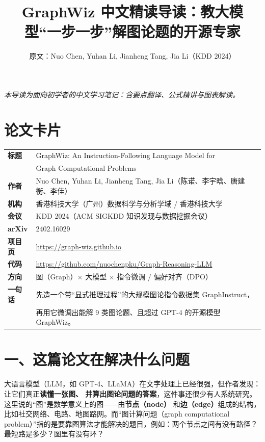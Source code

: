 \documentclass[11pt,UTF8,fontset=fandol]{ctexart}
\title{GraphWiz 中文精读导读：教大模型“一步一步”解图论题的开源专家}
\author{原文：Nuo Chen, Yuhan Li, Jianheng Tang, Jia Li（KDD 2024）}
\date{}
\begin{document}
\maketitle
\begin{center}\small\textit{本导读为面向初学者的中文学习笔记：含要点翻译、公式精讲与图表解读。}\end{center}

\section*{论文卡片}
\begin{center}
\begin{tabular}{@{}ll@{}}
\toprule
\textbf{标题} & GraphWiz: An Instruction-Following Language Model for \\
            & Graph Computational Problems \\
\textbf{作者} & Nuo Chen, Yuhan Li, Jianheng Tang, Jia Li（陈诺、李宇晗、唐建衡、李佳） \\
\textbf{机构} & 香港科技大学（广州）数据科学与分析学域 / 香港科技大学 \\
\textbf{会议} & KDD 2024（ACM SIGKDD 知识发现与数据挖掘会议） \\
\textbf{arXiv} & 2402.16029 \\
\textbf{项目页} & \url{https://graph-wiz.github.io} \\
\textbf{代码} & \url{https://github.com/nuochenpku/Graph-Reasoning-LLM} \\
\textbf{方向} & 图（Graph）$\times$ 大模型 $\times$ 指令微调 / 偏好对齐（DPO） \\
\textbf{一句话} & 先造一个带“显式推理过程”的大规模图论指令数据集 GraphInstruct，\\
              & 再用它微调出能解 9 类图论题、且超过 GPT-4 的开源模型 GraphWiz。 \\
\bottomrule
\end{tabular}
\end{center}

\section{一、这篇论文在解决什么问题}

大语言模型（LLM，如 GPT-4、LLaMA）在文字处理上已经很强，但作者发现：让它们真正\textbf{读懂一张图、
并算出图论问题的答案}，这件事还很少有人系统研究。这里说的“图”是数学意义上的图——由\textbf{节点（node）}
和\textbf{边（edge）}组成的结构，比如社交网络、电路、地图路网。而“图计算问题（graph computational
problem）”指的是要靠图算法才能解决的题目，例如：两个节点之间有没有路径？最短路是多少？图里有没有环？
\end{document}

